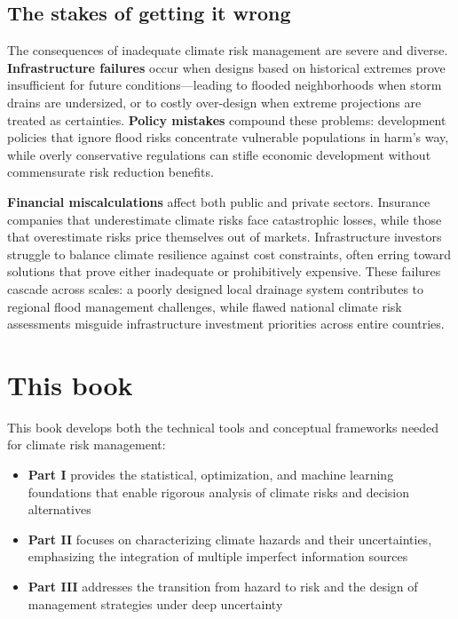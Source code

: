 \documentclass[
  letterpaper,
  DIV=11,
  numbers=noendperiod]{scrreprt}
\providecommand{\tightlist}{%
  \setlength{\itemsep}{0pt}\setlength{\parskip}{0pt}}
\begin{document}
\subsection*{The stakes of getting it
wrong}\label{the-stakes-of-getting-it-wrong}

The consequences of inadequate climate risk management are severe and
diverse. \textbf{Infrastructure failures} occur when designs based on
historical extremes prove insufficient for future conditions---leading
to flooded neighborhoods when storm drains are undersized, or to costly
over-design when extreme projections are treated as certainties.
\textbf{Policy mistakes} compound these problems: development policies
that ignore flood risks concentrate vulnerable populations in harm's
way, while overly conservative regulations can stifle economic
development without commensurate risk reduction benefits.

\textbf{Financial miscalculations} affect both public and private
sectors. Insurance companies that underestimate climate risks face
catastrophic losses, while those that overestimate risks price
themselves out of markets. Infrastructure investors struggle to balance
climate resilience against cost constraints, often erring toward
solutions that prove either inadequate or prohibitively expensive. These
failures cascade across scales: a poorly designed local drainage system
contributes to regional flood management challenges, while flawed
national climate risk assessments misguide infrastructure investment
priorities across entire countries.

\section*{This book}\label{this-book}


This book develops both the technical tools and conceptual frameworks
needed for climate risk management:

\begin{itemize}
\tightlist
\item
  \textbf{Part I} provides the statistical, optimization, and machine
  learning foundations that enable rigorous analysis of climate risks
  and decision alternatives
\item
  \textbf{Part II} focuses on characterizing climate hazards and their
  uncertainties, emphasizing the integration of multiple imperfect
  information sources
\item
  \textbf{Part III} addresses the transition from hazard to risk and the
  design of management strategies under deep uncertainty
\end{itemize}
\end{document}
